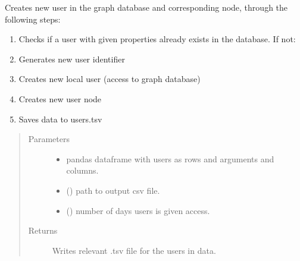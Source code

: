\documentclass[letterpaper,10pt,english]{sphinxmanual}
\begin{document}
\begin{fulllineitems}
\label{\detokenize{_autosummary/graphdb_builder.builder:graphdb_builder.builder.create_user.create_user}}
Creates new user in the graph database and corresponding node, through the following steps:
\begin{enumerate}
%
\item {} 
Checks if a user with given properties already exists in the database. If not:

\item {} 
Generates new user identifier

\item {} 
Creates new local user (access to graph database)

\item {} 
Creates new user node

\item {} 
Saves data to users.tsv

\end{enumerate}
\begin{quote}\begin{description}
\item[{Parameters}] \leavevmode\begin{itemize}
\item {} 
 \textendash{} pandas dataframe with users as rows and arguments and columns.

\item {} 
 () \textendash{} path to output csv file.

\item {} 
 () \textendash{} number of days users is given access.

\end{itemize}

\item[{Returns}] \leavevmode
Writes relevant .tsv file for the users in data.

\end{description}\end{quote}

\end{fulllineitems}
\end{document}
